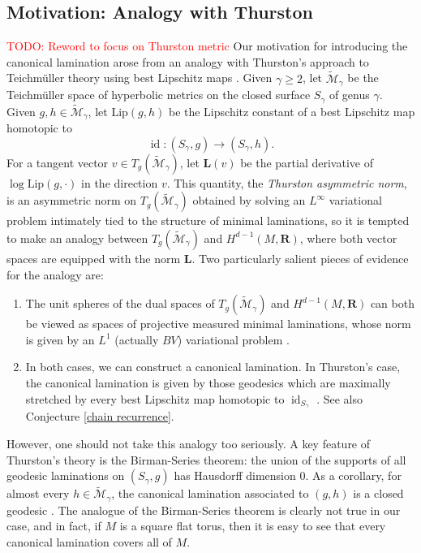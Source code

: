\documentclass[reqno,11pt]{amsart}
\newcommand{\RR}{\mathbf{R}}
\DeclareMathOperator{\id}{id}
\newcommand{\Lip}{\mathrm{Lip}}
\newcommand{\Comass}{\mathbf L}
\newcommand{\dfn}[1]{\emph{#1}\index{#1}}
\theoremstyle{definition}
\numberwithin{equation}{section}
\newcommand\todo[1]{\textcolor{red}{TODO: #1}}
\begin{document}
\subsection{Motivation: Analogy with Thurston}\label{Teichmuller} \todo{Reword to focus on Thurston metric}
Our motivation for introducing the canonical lamination arose from an analogy with Thurston's approach to Teichm\"uller theory using best Lipschitz maps \cite{Thurston98}.
Given $\gamma \geq 2$, let $\widetilde{\mathscr M}_\gamma$ be the Teichm\"uller space of hyperbolic metrics on the closed surface $S_\gamma$ of genus $\gamma$.
Given $g, h \in \widetilde{\mathscr M}_\gamma$, let $\Lip(g, h)$ be the Lipschitz constant of a best Lipschitz map homotopic to
$$\id: (S_\gamma, g) \to (S_\gamma, h).$$ 
For a tangent vector $v \in T_g(\widetilde{\mathscr M}_\gamma)$, let $\Comass(v)$ be the partial derivative of $\log \Lip(g, \cdot)$ in the direction $v$.
This quantity, the \dfn{Thurston asymmetric norm}, is an asymmetric norm on $T_g(\widetilde{\mathscr M}_\gamma)$ obtained by solving an $L^\infty$ variational problem intimately tied to the structure of minimal laminations, so it is tempted to make an analogy between $T_g(\widetilde{\mathscr M}_\gamma)$ and $H^{d - 1}(M, \RR)$, where both vector spaces are equipped with the norm $\Comass$.
Two particularly salient pieces of evidence for the analogy are:
\begin{enumerate}
\item The unit spheres of the dual spaces of $T_g(\widetilde{\mathscr M}_\gamma)$ and $H^{d - 1}(M, \RR)$ can both be viewed as spaces of projective measured minimal laminations, whose norm is given by an $L^1$ (actually $BV$) variational problem \cite[Theorem 5.1]{Thurston98}.
\item In both cases, we can construct a canonical lamination. In Thurston's case, the canonical lamination is given by those geodesics which are maximally stretched by every best Lipschitz map homotopic to $\id_{S_\gamma}$ \cite[\S8]{Thurston98}. See also Conjecture \ref{chain recurrence}.
\end{enumerate}
However, one should not take this analogy too seriously.
A key feature of Thurston's theory is the Birman-Series theorem: the union of the supports of all geodesic laminations on $(S_\gamma, g)$ has Hausdorff dimension $0$.
As a corollary, for almost every $h \in \widetilde{\mathscr M}_\gamma$, the canonical lamination associated to $(g, h)$ is a closed geodesic \cite[\S10]{Thurston98}.
The analogue of the Birman-Series theorem is clearly not true in our case, and in fact, if $M$ is a square flat torus, then it is easy to see that every canonical lamination covers all of $M$.
\end{document}
